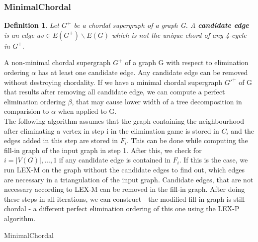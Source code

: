 \documentclass[a4wide]{article}
\newtheorem*{definition}{Definition}
\begin{document}
\subsubsection{MinimalChordal}

\begin{definition}
Let $G^{+}$ be a chordal supergraph of a graph G. A \textbf{candidate edge} is an edge $uv \in E(G^{+})\backslash E(G)$ which is not the unique chord of any 4-cycle in $G^{+}$.
\end{definition}

A non-minimal chordal supergraph $G^{+}$ of a graph G with respect to elimination ordering $\alpha$ has at least one candidate edge. Any candidate edge can be removed without destroying chordality. If we have a minimal chordal supergraph $G'^{+}$ of G that results after removing all candidate edge, we can compute a perfect elimination ordering $\beta$, that may cause lower width of a tree decomposition in comparision to $\alpha$ when applied to G. \\

The following algorithm assumes that the graph containing the neighbourhood after eliminating a vertex in step i in the elimination game is stored in $C_{i}$ and the edges added in this step are stored in $F_{i}$. This can be done while computing the fill-in graph of the input graph in step 1. After this, we check for $i = |V(G)|, \dots, 1$ if any candidate edge is contained in $F_{i}$. If this is the case, we run LEX-M on the graph without the candidate edges to find out, which edges are necessary in a triangulation of the input graph. Candidate edges, that are not necessary according to LEX-M can be removed in the fill-in graph.
After doing these steps in all iterations, we can construct - the modified fill-in graph is still chordal - a different perfect elimination ordering of this one using the LEX-P algorithm.

\begin{algorithm}
\caption{MinimalChordal}
\begin{algorithmic}[1]
\EndIf
\EndFor
{}
\EndIf
\EndFor
{}
\end{algorithmic}
\end{algorithm}
\end{document}
